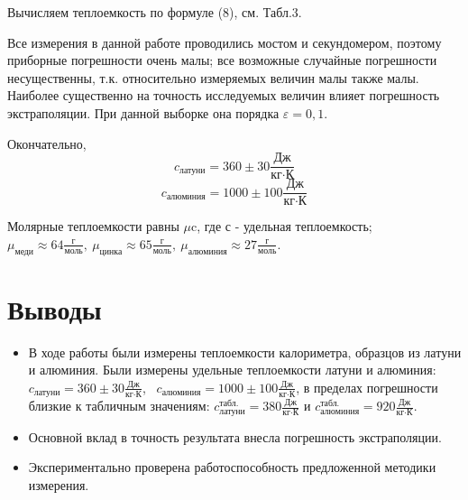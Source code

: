 \documentclass[12pt,a4paper]{article}
\begin{document}
Вычисляем теплоемкость по формуле (8), см. Табл.3.


\begin{table}[!h]
	\begin{center}
	\end{center}
	\caption{Результат вычислений теплоемкости}
\end{table}

Все измерения в данной работе проводились мостом и секундомером, поэтому приборные погрешности очень малы; все возможные случайные погрешности несущественны, т.к. относительно измеряемых величин малы также малы. Наиболее существенно на точность исследуемых величин влияет погрешность экстраполяции. При данной выборке она порядка $\varepsilon = 0,1$.

Окончательно, $$c_{\text{латуни}} = 360\pm30 \frac{\text{Дж}}{\text{кг}\cdot\text{К}}$$
$$c_{\text{алюминия}} = 1000\pm100 \frac{\text{Дж}}{\text{кг}\cdot\text{К}}$$

Молярные теплоемкости равны $\mu$c, где с - удельная теплоемкость;
 $\mu_{\text{меди}} \approx 64\frac{\text{г}}{\text{моль}},~ \mu_{\text{цинка}} \approx 65\frac{\text{г}}{\text{моль}},~ \mu_{\text{алюминия}} \approx 27\frac{\text{г}}{\text{моль}}$.

\section{Выводы}

\begin{itemize}
	\item В ходе работы были измерены теплоемкости калориметра, образцов из латуни и алюминия. Были измерены удельные теплоемкости латуни и алюминия: $c_{\text{латуни}} = 360\pm30 \frac{\text{Дж}}{\text{кг}\cdot\text{К}}$,~ $c_{\text{алюминия}} = 1000\pm100 \frac{\text{Дж}}{\text{кг}\cdot\text{К}}$, в пределах погрешности близкие к табличным значениям: $c^{\text{табл.}}_{\text{латуни}} = 380 \frac{\text{Дж}}{\text{кг}\cdot\text{К}}$ и $c^{\text{табл.}}_{\text{алюминия}} = 920 \frac{\text{Дж}}{\text{кг}\cdot\text{К}}$.
	
	
	\item Основной вклад в точность результата внесла погрешность экстраполяции.
	
	\item Экспериментально проверена работоспособность предложенной методики измерения.
\end{itemize}
\end{document}
